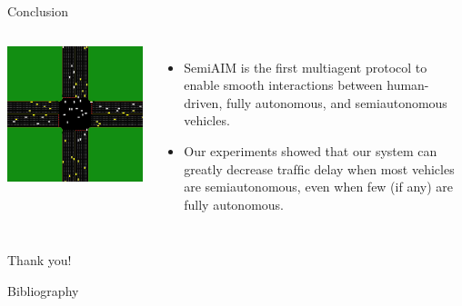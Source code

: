 \documentclass{beamer}
\begin{document}
\begin{frame}{Conclusion}
\begin{columns}[c]
	\includegraphics[width=\textwidth]{aim.png}
	\begin{itemize}
	\item SemiAIM is the first multiagent protocol to enable smooth
	interactions between human-driven, fully autonomous, and
	semiautonomous vehicles.\pause
	\item Our experiments showed that our system can greatly decrease
	trafﬁc delay when most vehicles are semiautonomous, even when few
	(if any) are fully autonomous.
	\end{itemize}
\end{columns}
\end{frame}

\begin{frame}{Thank you!}
\end{frame}

\begin{frame}{Bibliography}
\tiny{
}
\end{frame}
\end{document}
